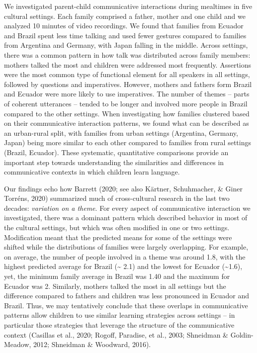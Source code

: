 \documentclass[
  man,floatsintext]{apa6}
\begin{document}
We investigated parent-child communicative interactions during mealtimes in five cultural settings. Each family comprised a father, mother and one child and we analyzed 10 minutes of video recordings. We found that families from Ecuador and Brazil spent less time talking and used fewer gestures compared to families from Argentina and Germany, with Japan falling in the middle. Across settings, there was a common pattern in how talk was distributed across family members: mothers talked the most and children were addressed most frequently. Assertions were the most common type of functional element for all speakers in all settings, followed by questions and imperatives. However, mothers and fathers form Brazil and Ecuador were more likely to use imperatives. The number of themes -- parts of coherent utterances -- tended to be longer and involved more people in Brazil compared to the other settings. When investigating how families clustered based on their communicative interaction patterns, we found what can be described as an urban-rural split, with families from urban settings (Argentina, Germany, Japan) being more similar to each other compared to families from rural settings (Brazil, Ecuador). These systematic, quantitative comparisons provide an important step towards understanding the similarities and differences in communicative contexts in which children learn language.

Our findings echo how Barrett (2020; see also Kärtner, Schuhmacher, \& Giner Torréns, 2020) summarized much of cross-cultural research in the last two decades: \emph{variation on a theme}. For every aspect of communicative interaction we investigated, there was a dominant pattern which described behavior in most of the cultural settings, but which was often modified in one or two settings. Modification meant that the predicted means for some of the settings were shifted while the distributions of families were largely overlapping. For example, on average, the number of people involved in a theme was around 1.8, with the highest predicted average for Brazil (\textasciitilde{} 2.1) and the lowest for Ecuador (\textasciitilde1.6), yet, the minimum family average in Brazil was 1.40 and the maximum for Ecuador was 2. Similarly, mothers talked the most in all settings but the difference compared to fathers and children was less pronounced in Ecuador and Brazil. Thus, we may tentatively conclude that these overlaps in communicative patterns allow children to use similar learning strategies across settings -- in particular those strategies that leverage the structure of the communicative context (Casillas et al., 2020; Rogoff, Paradise, et al., 2003; Shneidman \& Goldin-Meadow, 2012; Shneidman \& Woodward, 2016).
\end{document}
